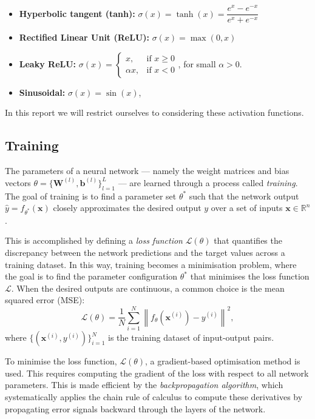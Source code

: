 \begin{itemize}
    \item \textbf{Hyperbolic tangent (tanh):} \quad 
    \( \sigma(x) = \tanh(x) = \dfrac{e^x - e^{-x}}{e^x + e^{-x}} \)

    \item \textbf{Rectified Linear Unit (ReLU):} \quad 
    \( \sigma(x) = \max(0, x) \)

    \item \textbf{Leaky ReLU:} \quad 
    \( \sigma(x) = 
    \begin{cases}
        x, & \text{if } x \geq 0 \\
        \alpha x, & \text{if } x < 0
    \end{cases} \), for small \( \alpha > 0 \).
    
    \item \textbf{Sinusoidal:} \quad 
    \( \sigma(x) = \sin(x) \),
\end{itemize}

In this report we will restrict ourselves to considering these activation functions.


\subsection{Training}\label{sec:nn_training}

The parameters of a neural network — namely the weight matrices and bias vectors 
\( \theta = \{ \mathbf{W}^{(l)}, \mathbf{b}^{(l)} \}_{l=1}^L \) — are learned through a process 
called \emph{training}. The goal of training is to find a parameter set $\theta^*$ such that the 
network output \( \hat{y} = f_{\theta^*}(\mathbf{x}) \) closely approximates the desired output \( y \) 
over a set of inputs \( \mathbf{x} \in \mathbb{R}^n \).

This is accomplished by defining a \emph{loss function} \( \mathcal{L}(\theta) \) that quantifies the 
discrepancy between the network predictions and the target values across a training dataset. 
In this way, training becomes a minimisation problem, where the goal is to find the parameter 
configuration $\theta^*$ that minimises the loss function $\mathcal{L}$.
When the desired outputs are continuous, a common choice is the mean squared error (MSE):
\[
    \mathcal{L}(\theta) = \frac{1}{N} \sum_{i=1}^{N} \left\| f_\theta(\mathbf{x}^{(i)}) - y^{(i)} \right\|^2,
\]
where \( \{ (\mathbf{x}^{(i)}, y^{(i)}) \}_{i=1}^N \) is the training dataset of input-output pairs.

To minimise the loss function, \( \mathcal{L}(\theta) \), a gradient-based optimisation method is 
used. This requires
computing the gradient of the loss with respect to all network parameters. This is made efficient by 
the \emph{backpropagation algorithm}, which systematically applies the chain rule of calculus to 
compute these derivatives by propagating error signals backward through the layers of the network.

